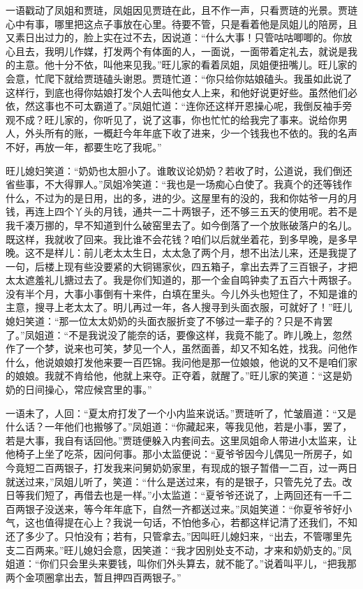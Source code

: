 \documentclass[12pt,oneside]{book}
\begin{document}
一语戳动了凤姐和贾琏，凤姐因见贾琏在此，且不作一声，只看贾琏的光景。贾琏心中有事，哪里把这点子事放在心里。待要不管，只是看着他是凤姐儿的陪房，且又素日出过力的，脸上实在过不去，因说道：“什么大事！只管咕咕唧唧的。你放心且去，我明儿作媒，打发两个有体面的人，一面说，一面带着定礼去，就说是我的主意。他十分不依，叫他来见我。”旺儿家的看着凤姐，凤姐便扭嘴儿。旺儿家的会意，忙爬下就给贾琏磕头谢恩。贾琏忙道：“你只给你姑娘磕头。我虽如此说了这样行，到底也得你姑娘打发个人去叫他女人上来，和他好说更好些。虽然他们必依，然这事也不可太霸道了。”凤姐忙道：“连你还这样开恩操心呢，我倒反袖手旁观不成？旺儿家的，你听见了，说了这事，你也忙忙的给我完了事来。说给你男人，外头所有的账，一概赶今年年底下收了进来，少一个钱我也不依的。我的名声不好，再放一年，都要生吃了我呢。”

旺儿媳妇笑道：“奶奶也太胆小了。谁敢议论奶奶？若收了时，公道说，我们倒还省些事，不大得罪人。”凤姐冷笑道：“我也是一场痴心白使了。我真个的还等钱作什么，不过为的是日用，出的多，进的少。这屋里有的没的，我和你姑爷一月的月钱，再连上四个丫头的月钱，通共一二十两银子，还不够三五天的使用呢。若不是我千凑万挪的，早不知道到什么破窑里去了。如今倒落了一个放账破落户的名儿。既这样，我就收了回来。我比谁不会花钱？咱们以后就坐着花，到多早晚，是多早晚。这不是样儿：前儿老太太生日，太太急了两个月，想不出法儿来，还是我提了一句，后楼上现有些没要紧的大铜锡家伙，四五箱子，拿出去弄了三百银子，才把太太遮羞礼儿搪过去了。我是你们知道的，那一个金自鸣钟卖了五百六十两银子。没有半个月，大事小事倒有十来件，白填在里头。今儿外头也短住了，不知是谁的主意，搜寻上老太太了。明儿再过一年，各人搜寻到头面衣服，可就好了！”旺儿媳妇笑道：“那一位太太奶奶的头面衣服折变了不够过一辈子的？只是不肯罢了。”凤姐道：“不是我说没了能奈的话，要像这样，我竟不能了。昨儿晚上，忽然作了一个梦，说来也可笑，梦见一个人，虽然面善，却又不知名姓，找我。问他作什么，他说娘娘打发他来要一百匹锦。我问他是那一位娘娘，他说的又不是咱们家的娘娘。我就不肯给他，他就上来夺。正夺着，就醒了。”旺儿家的笑道：“这是奶奶的日间操心，常应候宫里的事。”

一语未了，人回：“夏太府打发了一个小内监来说话。”贾琏听了，忙皱眉道：“又是什么话？一年他们也搬够了。”凤姐道：“你藏起来，等我见他，若是小事，罢了，若是大事，我自有话回他。”贾琏便躲入内套间去。这里凤姐命人带进小太监来，让他椅子上坐了吃茶，因问何事。那小太监便说：“夏爷爷因今儿偶见一所房子，如今竟短二百两银子，打发我来问舅奶奶家里，有现成的银子暂借一二百，过一两日就送过来，”凤姐儿听了，笑道：“什么是送过来，有的是银子，只管先兑了去。改日等我们短了，再借去也是一样。”小太监道：“夏爷爷还说了，上两回还有一千二百两银子没送来，等今年年底下，自然一齐都送过来。”凤姐笑道：“你夏爷爷好小气，这也值得提在心上？我说一句话，不怕他多心，若都这样记清了还我们，不知还了多少了。只怕没有；若有，只管拿去。”因叫旺儿媳妇来，“出去，不管哪里先支二百两来。”旺儿媳妇会意，因笑道：“我才因别处支不动，才来和奶奶支的。”凤姐道：“你们只会里头来要钱，叫你们外头算去，就不能了。”说着叫平儿，“把我那两个金项圈拿出去，暂且押四百两银子。”
\end{document}
